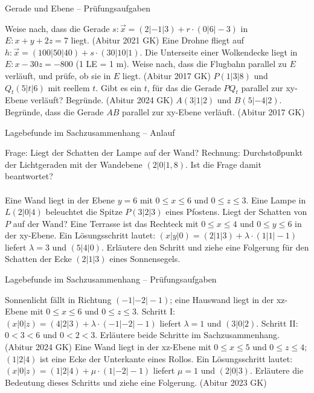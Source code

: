 \begin{aufgabe}{Gerade und Ebene – Prüfungsaufgaben}
\begin{teile}
\teil Weise nach, dass die Gerade $s: \vec{x} = (2 | -1 | 3) + r \cdot (0 | 6 | -3)$ in $E: x + y + 2z = 7$ liegt. \hfill (Abitur 2021 GK)
\teil Eine Drohne fliegt auf $h: \vec{x} = (100 | 50 | 40) + s \cdot (30 | 10 | 1)$. Die Unterseite einer Wolkendecke liegt in $E: x - 30z = -800$ (1 LE = 1 m). Weise nach, dass die Flugbahn parallel zu $E$ verläuft, und prüfe, ob sie in $E$ liegt. \hfill (Abitur 2017 GK)
\teil $P(1 | 3 | 8)$ und $Q_t(5 | t | 6)$ mit reellem $t$. Gibt es ein $t$, für das die Gerade $PQ_t$ parallel zur xy-Ebene verläuft? Begründe. \hfill (Abitur 2024 GK)
\teil $A(3 | 1 | 2)$ und $B(5 | -4 | 2)$. Begründe, dass die Gerade $AB$ parallel zur xy-Ebene verläuft. \hfill (Abitur 2017 GK)
\end{teile}
\end{aufgabe}

\begin{aufgabe}{Lagebefunde im Sachzusammenhang – Anlauf}
\begin{teile}
\teil Frage: Liegt der Schatten der Lampe auf der Wand? Rechnung: Durchstoßpunkt der Lichtgeraden mit der Wandebene $(2 | 0 | 1{,}8)$. Ist die Frage damit beantwortet? \\  \\ 
\teil Eine Wand liegt in der Ebene $y = 6$ mit $0 \le x \le 6$ und $0 \le z \le 3$. Eine Lampe in $L(2 | 0 | 4)$ beleuchtet die Spitze $P(3 | 2 | 3)$ eines Pfostens. Liegt der Schatten von $P$ auf der Wand?
\teil Eine Terrasse ist das Rechteck mit $0 \le x \le 4$ und $0 \le y \le 6$ in der xy-Ebene. Ein Lösungsschritt lautet: $(x | y | 0) = (2 | 1 | 3) + \lambda \cdot (1 | 1 | -1)$ liefert $\lambda = 3$ und $(5 | 4 | 0)$. Erläutere den Schritt und ziehe eine Folgerung für den Schatten der Ecke $(2 | 1 | 3)$ eines Sonnensegels.
\end{teile}
\end{aufgabe}

\begin{aufgabe}{Lagebefunde im Sachzusammenhang – Prüfungsaufgaben}
\begin{teile}
\teil Sonnenlicht fällt in Richtung $(-1 | -2 | -1)$; eine Hauswand liegt in der xz-Ebene mit $0 \le x \le 6$ und $0 \le z \le 3$. Schritt I: $(x | 0 | z) = (4 | 2 | 3) + \lambda \cdot (-1 | -2 | -1)$ liefert $\lambda = 1$ und $(3 | 0 | 2)$. Schritt II: $0 < 3 < 6$ und $0 < 2 < 3$. Erläutere beide Schritte im Sachzusammenhang. \hfill (Abitur 2024 GK)
\teil Eine Wand liegt in der xz-Ebene mit $0 \le x \le 5$ und $0 \le z \le 4$; $(1 | 2 | 4)$ ist eine Ecke der Unterkante eines Rollos. Ein Lösungsschritt lautet: $(x | 0 | z) = (1 | 2 | 4) + \mu \cdot (1 | -2 | -1)$ liefert $\mu = 1$ und $(2 | 0 | 3)$. Erläutere die Bedeutung dieses Schritts und ziehe eine Folgerung. \hfill (Abitur 2023 GK)
\end{teile}
\end{aufgabe}
